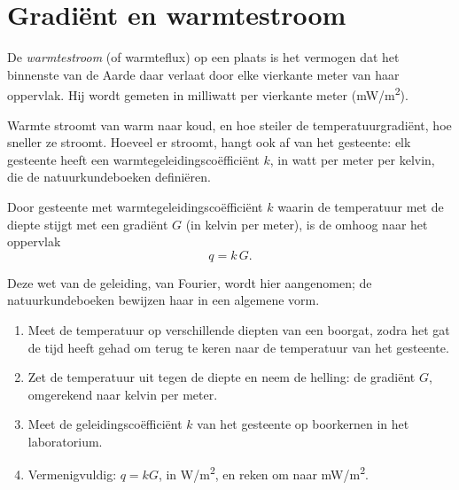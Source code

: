 \section{Gradiënt en warmtestroom}

\begin{definition}[Warmtestroom]\label{def:g12:internal-heat:heat-flow}
De \emph{warmtestroom} (of warmteflux) op een plaats is het
vermogen dat het binnenste van de Aarde daar verlaat door elke vierkante meter van haar
oppervlak. Hij wordt gemeten in milliwatt per vierkante meter
(\unit{mW/m^2}).
\end{definition}

Warmte stroomt van warm naar koud, en hoe steiler de temperatuurgradiënt, hoe
sneller ze stroomt. Hoeveel er stroomt, hangt ook af van het gesteente: elk gesteente heeft een
warmtegeleidingscoëfficiënt $k$, in watt per meter per kelvin, die de
natuurkundeboeken definiëren.

\begin{proposition}\label{prop:g12:internal-heat:fourier}
Door gesteente met warmtegeleidingscoëfficiënt $k$ waarin de temperatuur met de
diepte stijgt met een gradiënt $G$ (in kelvin per meter), is de  omhoog naar het
oppervlak
\[
  q = k\,G .
\]
\end{proposition}

Deze wet van de geleiding, van Fourier, wordt hier aangenomen; de natuurkundeboeken
bewijzen haar in een algemene vorm.

\begin{method}\label{met:g12:internal-heat:borehole}
\begin{enumerate}
  \item Meet de temperatuur op verschillende diepten van een boorgat, zodra het
        gat de tijd heeft gehad om terug te keren naar de temperatuur van het gesteente.
  \item Zet de temperatuur uit tegen de diepte en neem de helling: de gradiënt $G$,
        omgerekend naar kelvin per meter.
  \item Meet de geleidingscoëfficiënt $k$ van het gesteente op boorkernen in het
        laboratorium.
  \item Vermenigvuldig: $q = kG$, in \unit{W/m^2}, en reken om naar \unit{mW/m^2}.
\end{enumerate}
\end{method}

